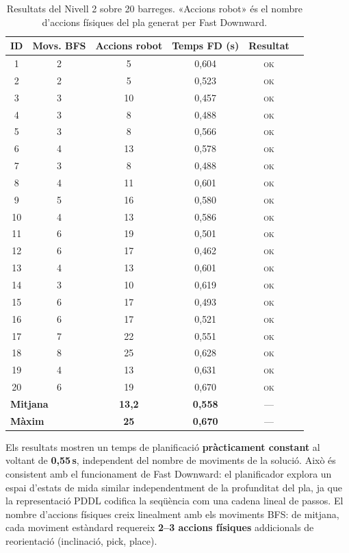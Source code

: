\documentclass[12pt, a4paper]{article}
\begin{document}
\begin{table}[H]
  \centering
  \small
  \begin{tabular}{cccccc}
    \toprule
    \textbf{ID} & \textbf{Movs. BFS} & \textbf{Accions robot} & \textbf{Temps FD (s)} & \textbf{Resultat} \\
    \midrule
    1  & 2 &  5 & 0{,}604 & \textsc{ok} \\
    2  & 2 &  5 & 0{,}523 & \textsc{ok} \\
    3  & 3 & 10 & 0{,}457 & \textsc{ok} \\
    4  & 3 &  8 & 0{,}488 & \textsc{ok} \\
    5  & 3 &  8 & 0{,}566 & \textsc{ok} \\
    6  & 4 & 13 & 0{,}578 & \textsc{ok} \\
    7  & 3 &  8 & 0{,}488 & \textsc{ok} \\
    8  & 4 & 11 & 0{,}601 & \textsc{ok} \\
    9  & 5 & 16 & 0{,}580 & \textsc{ok} \\
    10 & 4 & 13 & 0{,}586 & \textsc{ok} \\
    11 & 6 & 19 & 0{,}501 & \textsc{ok} \\
    12 & 6 & 17 & 0{,}462 & \textsc{ok} \\
    13 & 4 & 13 & 0{,}601 & \textsc{ok} \\
    14 & 3 & 10 & 0{,}619 & \textsc{ok} \\
    15 & 6 & 17 & 0{,}493 & \textsc{ok} \\
    16 & 6 & 17 & 0{,}521 & \textsc{ok} \\
    17 & 7 & 22 & 0{,}551 & \textsc{ok} \\
    18 & 8 & 25 & 0{,}628 & \textsc{ok} \\
    19 & 4 & 13 & 0{,}631 & \textsc{ok} \\
    20 & 6 & 19 & 0{,}670 & \textsc{ok} \\
    \midrule
    \multicolumn{2}{l}{\textbf{Mitjana}} & \textbf{13{,}2} & \textbf{0{,}558} & — \\
    \multicolumn{2}{l}{\textbf{Màxim}}  & \textbf{25}     & \textbf{0{,}670} & — \\
    \bottomrule
  \end{tabular}
  \caption{Resultats del Nivell 2 sobre 20 barreges. «Accions robot» és el nombre d'accions físiques del pla generat per Fast Downward.}
  \label{tab:fd_results}
\end{table}

Els resultats mostren un temps de planificació \textbf{pràcticament constant} al voltant de \textbf{0{,}55\,s}, independent del nombre de moviments de la solució. Això és consistent amb el funcionament de Fast Downward: el planificador explora un espai d'estats de mida similar independentment de la profunditat del pla, ja que la representació PDDL codifica la seqüència com una cadena lineal de passos. El nombre d'accions físiques creix linealment amb els moviments BFS: de mitjana, cada moviment estàndard requereix \textbf{2–3 accions físiques} addicionals de reorientació (inclinació, pick, place).
\end{document}
